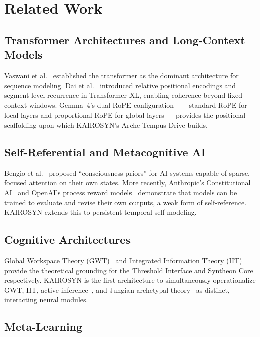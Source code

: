 \documentclass[conference]{IEEEtran}
\begin{document}
\section{Related Work}

\subsection{Transformer Architectures and Long-Context Models}

Vaswani et al.~\cite{vaswani2017} established the transformer as the dominant
architecture for sequence modeling. Dai et al.~\cite{dai2019} introduced
relative positional encodings and segment-level recurrence in Transformer-XL,
enabling coherence beyond fixed context windows. Gemma~4's dual RoPE
configuration~\cite{gemma4_2025} --- standard RoPE for local layers and
proportional RoPE for global layers --- provides the positional scaffolding
upon which KAIROSYN's Arche-Tempus Drive builds.

\subsection{Self-Referential and Metacognitive AI}

Bengio et al.~\cite{bengio2017} proposed ``consciousness priors'' for AI systems
capable of sparse, focused attention on their own states. More recently,
Anthropic's Constitutional AI~\cite{bai2022} and OpenAI's process reward
models~\cite{lightman2023} demonstrate that models can be trained to evaluate
and revise their own outputs, a weak form of self-reference. KAIROSYN
extends this to persistent temporal self-modeling.

\subsection{Cognitive Architectures}

Global Workspace Theory (GWT)~\cite{baars1988} and Integrated Information
Theory (IIT)~\cite{tononi2008} provide the theoretical grounding for the
Threshold Interface and Syntheon Core respectively. KAIROSYN is the first
architecture to simultaneously operationalize GWT, IIT, active
inference~\cite{friston2010}, and Jungian archetypal theory~\cite{jung1959}
as distinct, interacting neural modules.

\subsection{Meta-Learning}
\end{document}
